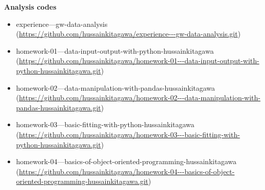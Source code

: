 \documentclass[11pt, letterpaper]{article}
\begin{document}
\newpage
\printbibliography
\textbf{Analysis codes}
\begin{itemize}
        \item experience---gw-data-analysis~\\(\url{https://github.com/hussainkitagawa/experience---gw-data-analysis.git})
        \item homework-01---data-input-output-with-python-hussainkitagawa~\\(\url{https://github.com/hussainkitagawa/homework-01---data-input-output-with-python-hussainkitagawa.git})
        \item homework-02---data-manipulation-with-pandas-hussainkitagawa~\\(\url{https://github.com/hussainkitagawa/homework-02---data-manipulation-with-pandas-hussainkitagawa.git})
        \item homework-03---basic-fitting-with-python-hussainkitagawa~\\(\url{https://github.com/hussainkitagawa/homework-03---basic-fitting-with-python-hussainkitagawa.git})
        \item homework-04---basics-of-object-oriented-programming-hussainkitagawa~\\(\url{https://github.com/hussainkitagawa/homework-04---basics-of-object-oriented-programming-hussainkitagawa.git})
\end{itemize}
\end{document}
